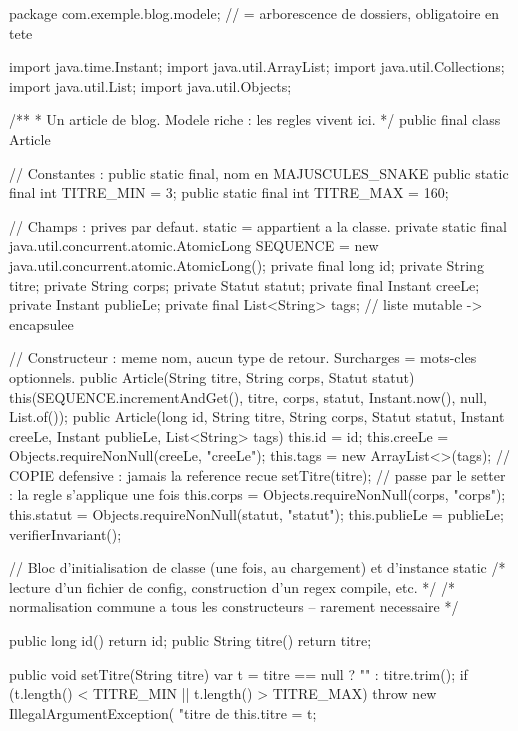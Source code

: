\begin{codejava}
package com.exemple.blog.modele;                       // = arborescence de dossiers, obligatoire en tete

import java.time.Instant;
import java.util.ArrayList;
import java.util.Collections;
import java.util.List;
import java.util.Objects;

/**
 * Un article de blog. Modele riche : les regles vivent ici.
 */
public final class Article {

    // Constantes : public static final, nom en MAJUSCULES_SNAKE
    public static final int TITRE_MIN = 3;
    public static final int TITRE_MAX = 160;

    // Champs : prives par defaut. static = appartient a la classe.
    private static final java.util.concurrent.atomic.AtomicLong SEQUENCE = new java.util.concurrent.atomic.AtomicLong();
    private final long id;
    private String titre;
    private String corps;
    private Statut statut;
    private final Instant creeLe;
    private Instant publieLe;
    private final List<String> tags;                    // liste mutable -> encapsulee

    // Constructeur : meme nom, aucun type de retour. Surcharges = mots-cles optionnels.
    public Article(String titre, String corps, Statut statut) {
        this(SEQUENCE.incrementAndGet(), titre, corps, statut, Instant.now(), null, List.of());
    }
    public Article(long id, String titre, String corps, Statut statut,
                   Instant creeLe, Instant publieLe, List<String> tags) {
        this.id = id;
        this.creeLe = Objects.requireNonNull(creeLe, "creeLe");
        this.tags = new ArrayList<>(tags);              // COPIE defensive : jamais la reference recue
        setTitre(titre);                                // passe par le setter : la regle s'applique une fois
        this.corps = Objects.requireNonNull(corps, "corps");
        this.statut = Objects.requireNonNull(statut, "statut");
        this.publieLe = publieLe;
        verifierInvariant();
    }

    // Bloc d'initialisation de classe (une fois, au chargement) et d'instance
    static { /* lecture d'un fichier de config, construction d'un regex compile, etc. */ }
    { /* normalisation commune a tous les constructeurs -- rarement necessaire */ }

    public long id() { return id; }
    public String titre() { return titre; }

    public void setTitre(String titre) {
        var t = titre == null ? "" : titre.trim();
        if (t.length() < TITRE_MIN || t.length() > TITRE_MAX) {
            throw new IllegalArgumentException(
                "titre de %
        }
        this.titre = t;
    }

}
\end{codejava}
